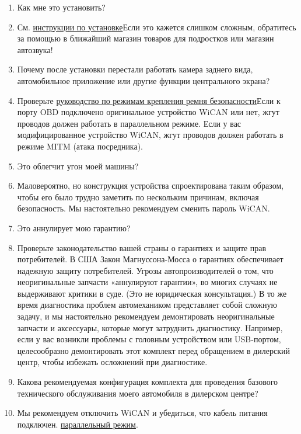 \documentclass[superscriptaddress,onecolumn,floatfix]{revtex4-2}
\begin{document}
\begin{enumerate}
  \item[В:] Как мне это установить?
  \item[А:] См. \href{https://github.com/tylerharvey/Ioniq5_CAN/blob/main/guides/}{инструкции по установке}Если это кажется слишком сложным, обратитесь за помощью в ближайший магазин товаров для подростков или магазин автозвука!
  \item[В:] Почему после установки перестали работать камера заднего вида, автомобильное приложение или другие функции центрального экрана?
  \item[А:] Проверьте \href{https://github.com/tylerharvey/Ioniq5_CAN/blob/main/guides/harnesses/head_unit_MITM/MITM_harness_modes.pdf}{руководство по режимам крепления ремня безопасности}Если к порту OBD подключено оригинальное устройство WiCAN или нет, жгут проводов должен работать в параллельном режиме. Если у вас модифицированное устройство WiCAN, жгут проводов должен работать в режиме MITM (атака посредника).
  \item[В:] Это облегчит угон моей машины?
  \item[А:] Маловероятно, но конструкция устройства спроектирована таким образом, чтобы его было трудно заметить по нескольким причинам, включая безопасность. Мы настоятельно рекомендуем сменить пароль WiCAN. 
  \item[В:] Это аннулирует мою гарантию?
  \item[А:] Проверьте законодательство вашей страны о гарантиях и защите прав потребителей. В США Закон Магнуссона-Мосса о гарантиях обеспечивает надежную защиту потребителей. Угрозы автопроизводителей о том, что неоригинальные запчасти «аннулируют гарантии», во многих случаях не выдерживают критики в суде. (Это не юридическая консультация.) В то же время диагностика проблем автомехаником представляет собой сложную задачу, и мы настоятельно рекомендуем демонтировать неоригинальные запчасти и аксессуары, которые могут затруднить диагностику. Например, если у вас возникли проблемы с головным устройством или USB-портом, целесообразно демонтировать этот комплект перед обращением в дилерский центр, чтобы избежать осложнений при диагностике. 
  \item[В:] Какова рекомендуемая конфигурация комплекта для проведения базового технического обслуживания моего автомобиля в дилерском центре?
  \item[А:] Мы рекомендуем отключить WiCAN и убедиться, что кабель питания подключен. \href{https://github.com/tylerharvey/Ioniq5_CAN/blob/main/guides/harnesses/head_unit_MITM/MITM_harness_modes.pdf}{параллельный режим}.

\end{enumerate}
\end{document}
